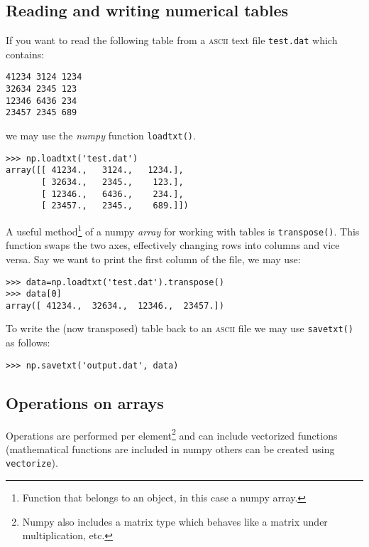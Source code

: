 \documentclass[10pt,a4paper]{article}
\begin{document}
\subsection{Reading and writing numerical tables}
\label{numpy_io}
If you want to read the following table from a \textsc{ascii} text file \verb|test.dat| which contains:
\begin{Verbatim}
41234 3124 1234
32634 2345 123
12346 6436 234
23457 2345 689
\end{Verbatim}
we may use the \emph{numpy} function \verb|loadtxt()|.
\begin{lstlisting}
>>> np.loadtxt('test.dat')
array([[ 41234.,   3124.,   1234.],
       [ 32634.,   2345.,    123.],
       [ 12346.,   6436.,    234.],
       [ 23457.,   2345.,    689.]])
\end{lstlisting}
A useful method\footnote{Function that belongs to an object, in this case a numpy array.} of a numpy \emph{array} for working with tables is \verb|transpose()|.
This function swaps the two axes, effectively changing rows into columns and vice versa.
Say we want to print the first column of the file, we may use:
\begin{lstlisting}
>>> data=np.loadtxt('test.dat').transpose()
>>> data[0]
array([ 41234.,  32634.,  12346.,  23457.])
\end{lstlisting}
To write the (now transposed) table back to an \textsc{ascii} file we may use \verb|savetxt()| as follows:
\begin{lstlisting}
>>> np.savetxt('output.dat', data)
\end{lstlisting}
\subsection{Operations on arrays}
Operations are performed per element\footnote{Numpy also includes a matrix type which behaves like a matrix under multiplication, etc.} and can include vectorized functions (mathematical functions are included in numpy others can be created using \verb|vectorize|).
\end{document}
